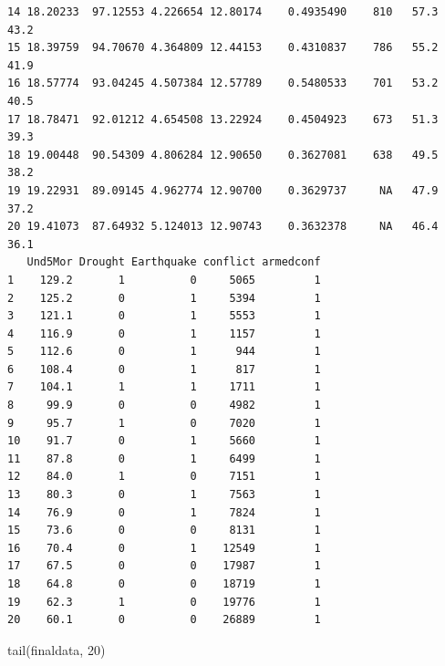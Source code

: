 \documentclass[
  11pt,
  letterpaper,
  DIV=11,
  numbers=noendperiod]{scrartcl}
\newenvironment{Shaded}{\begin{snugshade}}{\end{snugshade}}
\newcommand{\DecValTok}[1]{\textcolor[rgb]{0.68,0.00,0.00}{#1}}
\newcommand{\FunctionTok}[1]{\textcolor[rgb]{0.28,0.35,0.67}{#1}}
\newcommand{\NormalTok}[1]{\textcolor[rgb]{0.00,0.23,0.31}{#1}}
\begin{document}
\begin{verbatim}
14 18.20233  97.12553 4.226654 12.80174    0.4935490    810   57.3   43.2
15 18.39759  94.70670 4.364809 12.44153    0.4310837    786   55.2   41.9
16 18.57774  93.04245 4.507384 12.57789    0.5480533    701   53.2   40.5
17 18.78471  92.01212 4.654508 13.22924    0.4504923    673   51.3   39.3
18 19.00448  90.54309 4.806284 12.90650    0.3627081    638   49.5   38.2
19 19.22931  89.09145 4.962774 12.90700    0.3629737     NA   47.9   37.2
20 19.41073  87.64932 5.124013 12.90743    0.3632378     NA   46.4   36.1
   Und5Mor Drought Earthquake conflict armedconf
1    129.2       1          0     5065         1
2    125.2       0          1     5394         1
3    121.1       0          1     5553         1
4    116.9       0          1     1157         1
5    112.6       0          1      944         1
6    108.4       0          1      817         1
7    104.1       1          1     1711         1
8     99.9       0          0     4982         1
9     95.7       1          0     7020         1
10    91.7       0          1     5660         1
11    87.8       0          1     6499         1
12    84.0       1          0     7151         1
13    80.3       0          1     7563         1
14    76.9       0          1     7824         1
15    73.6       0          0     8131         1
16    70.4       0          1    12549         1
17    67.5       0          0    17987         1
18    64.8       0          0    18719         1
19    62.3       1          0    19776         1
20    60.1       0          0    26889         1
\end{verbatim}

\begin{Shaded}
\begin{Highlighting}[]
\FunctionTok{tail}\NormalTok{(finaldata, }\DecValTok{20}\NormalTok{)}
\end{Highlighting}
\end{Shaded}
\end{document}
